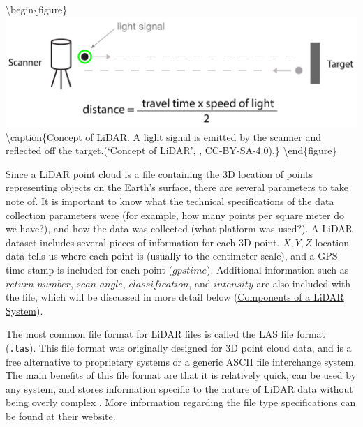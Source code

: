 \documentclass[
]{book}
\begin{document}
\textbackslash begin\{figure\}
\includegraphics[width=0.8\linewidth]{images/15-Concept-of-LiDAR} \textbackslash caption\{Concept of LiDAR. A light signal is emitted by the scanner and reflected off the target.(`Concept of LiDAR', \citet{cartographer3d_concept_2021}, CC-BY-SA-4.0).\}\label{fig:15-Concept-of-LiDAR}
\textbackslash end\{figure\}

Since a LiDAR point cloud is a file containing the 3D location of points representing objects on the Earth's surface, there are several parameters to take note of. It is important to know what the technical specifications of the data collection parameters were (for example, how many points per square meter do we have?), and how the data was collected (what platform was used?). A LiDAR dataset includes several pieces of information for each 3D point. \(X,Y,Z\) location data tells us where each point is (usually to the centimeter scale), and a GPS time stamp is included for each point (\(gpstime\)). Additional information such as \(return\) \(number\), \(scan\) \(angle\), \(classification\), and \(intensity\) are also included with the file, which will be discussed in more detail below (\protect\hyperlink{components-of-a-lidar-system}{Components of a LiDAR System}).

The most common file format for LiDAR files is called the LAS file format (\texttt{.las}). This file format was originally designed for 3D point cloud data, and is a free alternative to proprietary systems or a generic ASCII file interchange system. The main benefits of this file format are that it is relatively quick, can be used by any system, and stores information specific to the nature of LiDAR data without being overly complex \citep{american_society_for_photogrammetry__remote_sensing_laser_2019}. More information regarding the file type specifications can be found \href{https://www.asprs.org/divisions-committees/lidar-division/laser-las-file-format-exchange-activities}{at their website}.
\end{document}
